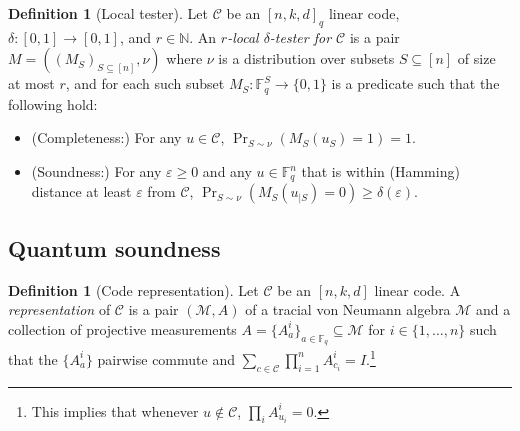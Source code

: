 \documentclass[11pt]{article}
\theoremstyle{definition}
\newtheorem{definition}[theorem]{Definition}
\newcommand{\code}{\mathcal{C}}
\newcommand{\Id}{\ensuremath{I}}
\newcommand{\field}{\mathbb{F}_2}
\newcommand{\N}{\ensuremath{\mathbb{N}}}
\newcommand{\F}{\ensuremath{\mathbb{F}}}
\newcommand{\mM}{\ensuremath{\mathcal{M}}}
\newcommand{\eps}{\varepsilon}
\begin{document}
\begin{definition}[Local tester]\label{def:code-test}
Let $\code$ be an $[n,k,d]_q$ linear code, $\delta:[0,1]\to[0,1]$, and $r\in \N$.
 An \emph{$r$-local $\delta$-tester for $\code$} is a pair $M = ((M_S)_{S \subseteq [n]},\nu)$ where $\nu$ is a distribution over subsets $S\subseteq [n]$ of size at most $r$, and for each such subset $M_S:\F_q^S\to\{0,1\}$ is a predicate such that the following hold:
\begin{itemize} 
\item (Completeness:) For any $u\in \code$, $\Pr_{S\sim \nu}( M_S(u_S)=1)=1$.
\item (Soundness:) For any $\eps\geq 0$ and any $u\in \F_q^n$ that is within (Hamming) distance at least  $\eps$ from $\code$, $\Pr_{S\sim\nu}(M_S(u_{|S})=0)\geq \delta(\eps)$.  
\end{itemize}
\end{definition}


\subsection{Quantum soundness}
\label{sec:q-soundness}

\begin{definition}[Code representation]
Let $\code$ be an $[n,k,d]$ linear code. A \emph{representation} of $\code$ is a pair $(\mM,A)$ of a tracial von Neumann algebra $\mM$ and a collection of projective measurements $A = \{A^i_a\}_{a\in\F_q} \subseteq\mM$ for $i\in\{1,\ldots,n\}$ such that the $\{A^i_a\}$ pairwise commute and $\sum_{c\in\code} \prod_{i=1}^n A^i_{c_i}=\Id$.\footnote{This implies that whenever $u\notin \code$, $\prod_i A^i_{u_i}=0$.} 
\end{definition}
\end{document}
